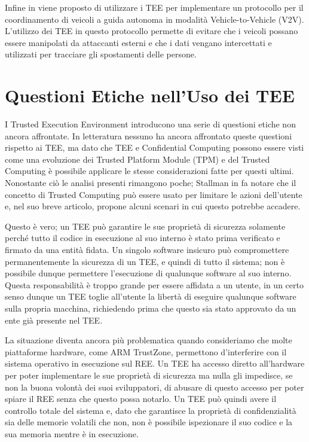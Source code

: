 \documentclass[12pt,italian]{report}
\begin{document}
\bigbreak \noindent

Infine in \cite{teeuses_vehicles} viene proposto di utilizzare i TEE per
implementare un protocollo per il coordinamento di veicoli a guida
autonoma in modalità Vehicle-to-Vehicle (V2V).
L'utilizzo dei TEE in questo protocollo permette di evitare che i veicoli
possano essere manipolati da attaccanti esterni e che i dati vengano
intercettati e utilizzati per tracciare gli spostamenti delle persone. 

\section{Questioni Etiche nell'Uso dei TEE}
\label{sec:etica-tee}
I Trusted Execution Environment introducono una serie di questioni etiche
non ancora affrontate.
In letteratura nessuno ha ancora affrontato queste questioni rispetto ai TEE,
ma dato che TEE e Confidential Computing possono essere visti come una
evoluzione dei Trusted Platform Module (TPM) e del Trusted Computing 
è possibile applicare le stesse considerazioni fatte per questi ultimi.
Nonostante ciò le analisi presenti rimangono poche; Stallman in
\cite{stallman2021tpm} fa notare che il concetto di Trusted Computing può
essere usato per limitare le azioni dell'utente e, nel suo breve articolo,
propone alcuni scenari in cui questo potrebbe accadere. 

Questo è vero; un TEE può garantire le sue proprietà di sicurezza solamente
perché tutto il codice in esecuzione al suo interno è stato prima verificato
e firmato da una entità fidata.
Un singolo software insicuro può compromettere permanentemente la sicurezza
di un TEE, e quindi di tutto il sistema; non è possibile dunque permettere
l'esecuzione di qualunque software al suo interno.
Questa responsabilità è troppo grande per essere affidata a un utente,
in un certo senso dunque un TEE toglie all'utente la libertà di eseguire
qualunque software sulla propria macchina, richiedendo prima che questo
sia stato approvato da un ente già presente nel TEE.

La situazione diventa ancora più problematica quando consideriamo che
molte piattaforme hardware, come ARM TrustZone, permettono d'interferire
con il sistema operativo in esecuzione sul REE. %
Un TEE ha accesso diretto all'hardware per poter implementare le sue proprietà
di sicurezza ma nulla gli impedisce, se non la buona volontà dei suoi
sviluppatori, di abusare di questo accesso per poter spiare il REE senza che
questo possa notarlo.
Un TEE può quindi avere il controllo totale del sistema e, dato che garantisce
la proprietà di confidenzialità sia delle memorie volatili che non, non è
possibile ispezionare il suo codice e la sua memoria mentre è in esecuzione.
\end{document}
